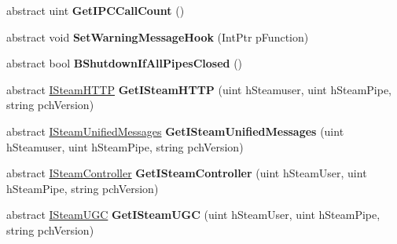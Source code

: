 \begin{DoxyCompactItemize}
\mbox{\label{class_valve_1_1_steamworks_1_1_i_steam_client_a1afef6a2d0455b007ef868261902db61}} 
abstract uint {\bfseries Get\+I\+P\+C\+Call\+Count} ()
\item 
\mbox{\label{class_valve_1_1_steamworks_1_1_i_steam_client_a9c99caf5ce6e08283e9cda987329cc0e}} 
abstract void {\bfseries Set\+Warning\+Message\+Hook} (Int\+Ptr p\+Function)
\item 
\mbox{\label{class_valve_1_1_steamworks_1_1_i_steam_client_af6e8b69ac807f67aa9b01f1fe3dc875d}} 
abstract bool {\bfseries B\+Shutdown\+If\+All\+Pipes\+Closed} ()
\item 
\mbox{\label{class_valve_1_1_steamworks_1_1_i_steam_client_aba1349315dcd3cb8405e48fe11ec40f9}} 
abstract \hyperlink{class_valve_1_1_steamworks_1_1_i_steam_h_t_t_p}{I\+Steam\+H\+T\+TP} {\bfseries Get\+I\+Steam\+H\+T\+TP} (uint h\+Steamuser, uint h\+Steam\+Pipe, string pch\+Version)
\item 
\mbox{\label{class_valve_1_1_steamworks_1_1_i_steam_client_af6d0bbf0ff1d355a2cf84620d29ecd4b}} 
abstract \hyperlink{class_valve_1_1_steamworks_1_1_i_steam_unified_messages}{I\+Steam\+Unified\+Messages} {\bfseries Get\+I\+Steam\+Unified\+Messages} (uint h\+Steamuser, uint h\+Steam\+Pipe, string pch\+Version)
\item 
\mbox{\label{class_valve_1_1_steamworks_1_1_i_steam_client_a0013c58ffdf9e79b4d48c8660a951d46}} 
abstract \hyperlink{class_valve_1_1_steamworks_1_1_i_steam_controller}{I\+Steam\+Controller} {\bfseries Get\+I\+Steam\+Controller} (uint h\+Steam\+User, uint h\+Steam\+Pipe, string pch\+Version)
\item 
\mbox{\label{class_valve_1_1_steamworks_1_1_i_steam_client_ad5b1bddf7c83de151c4e8ec7f67c582f}} 
abstract \hyperlink{class_valve_1_1_steamworks_1_1_i_steam_u_g_c}{I\+Steam\+U\+GC} {\bfseries Get\+I\+Steam\+U\+GC} (uint h\+Steam\+User, uint h\+Steam\+Pipe, string pch\+Version)
\item 

\end{DoxyCompactItemize}
